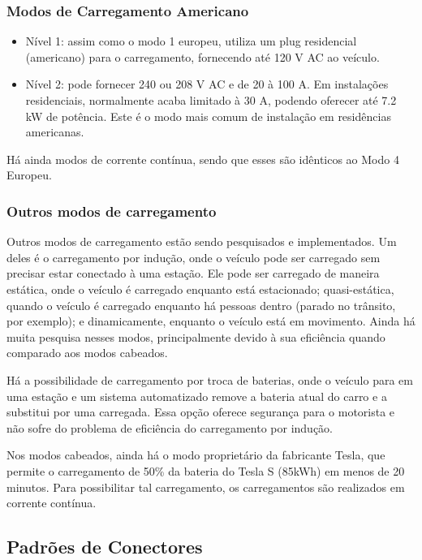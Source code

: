 \subsubsection{Modos de Carregamento Americano}

\begin{itemize}
  \item Nível 1: assim como o modo 1 europeu, utiliza um plug residencial (americano) para o carregamento, fornecendo até 120 V AC ao veículo.
  \item Nível 2: pode fornecer 240 ou 208 V AC e de 20 à 100 A. Em instalações residenciais, normalmente acaba limitado à 30 A, podendo oferecer até 7.2 kW de potência. Este é o modo mais comum de instalação em residências americanas.
\end{itemize}

Há ainda modos de corrente contínua, sendo que esses são idênticos ao Modo 4 Europeu.

\subsubsection{Outros modos de carregamento}

Outros modos de carregamento estão sendo pesquisados e implementados. Um deles é o carregamento por indução, onde o veículo pode ser carregado sem precisar estar conectado à uma estação. Ele pode ser carregado de maneira estática, onde o veículo é carregado enquanto está estacionado; quasi-estática, quando o veículo é carregado enquanto há pessoas dentro (parado no trânsito, por exemplo); e dinamicamente, enquanto o veículo está em movimento. Ainda há muita pesquisa nesses modos, principalmente devido à sua eficiência quando comparado aos modos cabeados.

Há a possibilidade de carregamento por troca de baterias, onde o veículo para em uma estação e um sistema automatizado remove a bateria atual do carro e a substitui por uma carregada. Essa opção oferece segurança para o motorista e não sofre do problema de eficiência do carregamento por indução.

Nos modos cabeados, ainda há o modo proprietário da fabricante Tesla, que permite o carregamento de 50\% da bateria do Tesla S (85kWh) em menos de 20 minutos. Para possibilitar tal carregamento, os carregamentos são realizados em corrente contínua.

\subsection{Padrões de Conectores}

